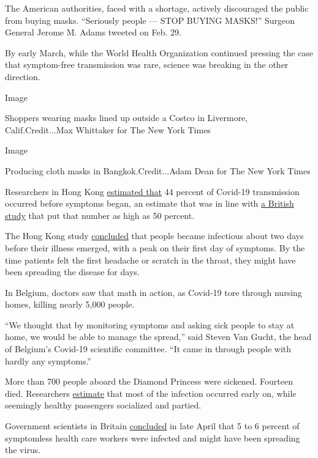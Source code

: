 The American authorities, faced with a shortage, actively discouraged
the public from buying masks. ``Seriously people --- STOP BUYING
MASKS!'' Surgeon General Jerome M. Adams tweeted on Feb. 29.

By early March, while the World Health Organization continued pressing
the case that symptom-free transmission was rare, science was breaking
in the other direction.

Image

Shoppers wearing masks lined up outside a Costco in Livermore,
Calif.Credit...Max Whittaker for The New York Times

Image

Producing cloth masks in Bangkok.Credit...Adam Dean for The New York
Times

Researchers in Hong Kong
\href{https://www.nature.com/articles/s41591-020-0869-5.pdf}{estimated
that} 44 percent of Covid-19 transmission occurred before symptoms
began, an estimate that was in line with
\href{https://science.sciencemag.org/content/368/6491/eabb6936}{a
British study} that put that number as high as 50 percent.

The Hong Kong study
\href{https://www.nature.com/articles/s41591-020-0869-5.pdf}{concluded}
that people became infectious about two days before their illness
emerged, with a peak on their first day of symptoms. By the time
patients felt the first headache or scratch in the throat, they might
have been spreading the disease for days.

In Belgium, doctors saw that math in action, as Covid-19 tore through
nursing homes, killing nearly 5,000 people.

``We thought that by monitoring symptoms and asking sick people to stay
at home, we would be able to manage the spread,'' said Steven Van Gucht,
the head of Belgium's Covid-19 scientific committee. ``It came in
through people with hardly any symptoms.''

More than 700 people aboard the Diamond Princess were sickened. Fourteen
died. Researchers
\href{https://www.eurosurveillance.org/content/10.2807/1560-7917.ES.2020.25.10.2000180\#html_fulltext}{estimate}
that most of the infection occurred early on, while seemingly healthy
passengers socialized and partied.

Government scientists in Britain
\href{https://assets.publishing.service.gov.uk/government/uploads/system/uploads/attachment_data/file/888804/S0399_Thirtieth_SAGE_meeting_on_Covid-19_.pdf}{concluded}
in late April that 5 to 6 percent of symptomless health care workers
were infected and might have been spreading the virus.


